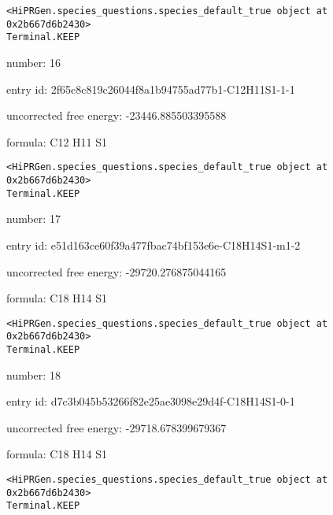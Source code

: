 \documentclass{article}
\begin{document}
\vspace{1cm}
\begin{verbatim}
<HiPRGen.species_questions.species_default_true object at 0x2b667d6b2430>
Terminal.KEEP
\end{verbatim}


number: 16



entry id: 2f65c8c819c26044f8a1b94755ad77b1-C12H11S1-1-1



uncorrected free energy: -23446.885503395588



formula: C12 H11 S1


\vspace{1cm}
\begin{verbatim}
<HiPRGen.species_questions.species_default_true object at 0x2b667d6b2430>
Terminal.KEEP
\end{verbatim}


number: 17



entry id: e51d163ce60f39a477fbac74bf153e6e-C18H14S1-m1-2



uncorrected free energy: -29720.276875044165



formula: C18 H14 S1


\vspace{1cm}
\begin{verbatim}
<HiPRGen.species_questions.species_default_true object at 0x2b667d6b2430>
Terminal.KEEP
\end{verbatim}


number: 18



entry id: d7c3b045b53266f82e25ae3098e29d4f-C18H14S1-0-1



uncorrected free energy: -29718.678399679367



formula: C18 H14 S1


\vspace{1cm}
\begin{verbatim}
<HiPRGen.species_questions.species_default_true object at 0x2b667d6b2430>
Terminal.KEEP
\end{verbatim}
\end{document}
